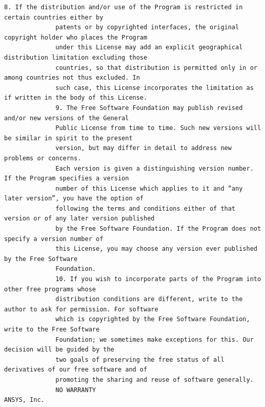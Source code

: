\begin{lstlisting}[basicstyle=\ttfamily\scriptsize,breaklines=true]
              8. If the distribution and/or use of the Program is restricted in certain countries either by
              patents or by copyrighted interfaces, the original copyright holder who places the Program
              under this License may add an explicit geographical distribution limitation excluding those
              countries, so that distribution is permitted only in or among countries not thus excluded. In
              such case, this License incorporates the limitation as if written in the body of this License.
              9. The Free Software Foundation may publish revised and/or new versions of the General
              Public License from time to time. Such new versions will be similar in spirit to the present
              version, but may differ in detail to address new problems or concerns.
              Each version is given a distinguishing version number. If the Program specifies a version
              number of this License which applies to it and “any later version”, you have the option of
              following the terms and conditions either of that version or of any later version published
              by the Free Software Foundation. If the Program does not specify a version number of
              this License, you may choose any version ever published by the Free Software
              Foundation.
              10. If you wish to incorporate parts of the Program into other free programs whose
              distribution conditions are different, write to the author to ask for permission. For software
              which is copyrighted by the Free Software Foundation, write to the Free Software
              Foundation; we sometimes make exceptions for this. Our decision will be guided by the
              two goals of preserving the free status of all derivatives of our free software and of
              promoting the sharing and reuse of software generally.
              NO WARRANTY
ANSYS, Inc.


\end{lstlisting}
